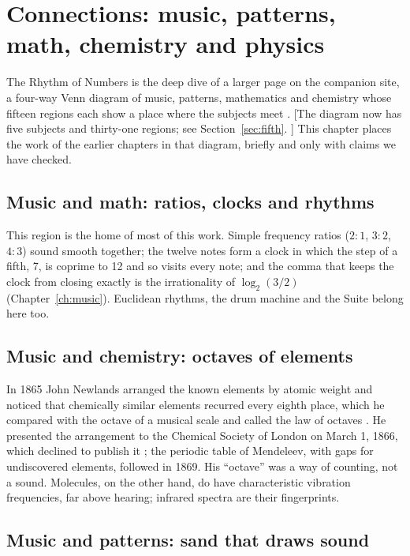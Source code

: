 \chapter{Connections: music, patterns, math, chemistry and physics}\label{ch:connections}

The Rhythm of Numbers is the deep dive of a larger page on the companion site, a four-way Venn diagram of music, patterns, mathematics and chemistry whose fifteen regions each show a place where the subjects meet \citep{ConnectionsSite}. [The diagram now has five subjects and thirty-one regions; see Section~\ref{sec:fifth}. \addedon{\revE}] This chapter places the work of the earlier chapters in that diagram, briefly and only with claims we have checked.

\section{Music and math: ratios, clocks and rhythms}

This region is the home of most of this work. Simple frequency ratios ($2{:}1$, $3{:}2$, $4{:}3$) sound smooth together; the twelve notes form a clock in which the step of a fifth, 7, is coprime to 12 and so visits every note; and the comma that keeps the clock from closing exactly is the irrationality of $\log_2(3/2)$ (Chapter~\ref{ch:music}). Euclidean rhythms, the drum machine and the Suite belong here too.

\section{Music and chemistry: octaves of elements}

In 1865 John Newlands arranged the known elements by atomic weight and noticed that chemically similar elements recurred every eighth place, which he compared with the octave of a musical scale and called the law of octaves \citep{LindaHallNewlands}. He presented the arrangement to the Chemical Society of London on March 1, 1866, which declined to publish it \citep{LindaHallNewlands}; the periodic table of Mendeleev, with gaps for undiscovered elements, followed in 1869. His ``octave'' was a way of counting, not a sound. Molecules, on the other hand, do have characteristic vibration frequencies, far above hearing; infrared spectra are their fingerprints.

\section{Music and patterns: sand that draws sound}


